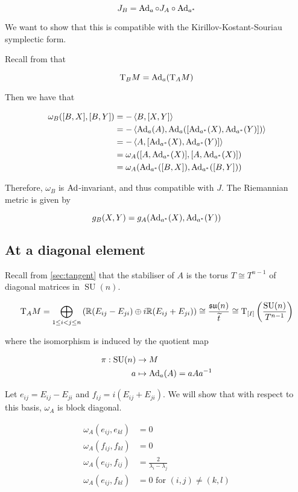 \documentclass{article}
\DeclareMathOperator{\SU}{SU}
\newcommand{\su}{\mathfrak{su}}
\renewcommand{\tilde}{\widetilde}
\begin{document}
\[J_B = \operatorname{Ad}_a \circ J_A \circ \operatorname{Ad}_{a^*}\]

We want to show that this is compatible with the Kirillov-Kostant-Souriau symplectic form.

Recall from that

\[\mathrm{T}_BM = \operatorname{Ad}_a(\mathrm{T}_A M)\]

Then we have that

\begin{align*}
    \omega_B([B, X], [B, Y]) &= -\left\langle B, [X, Y] \right\rangle \\
    &= -\left\langle \operatorname{Ad}_a(A), \operatorname{Ad}_a([\operatorname{Ad}_{a^*}(X), \operatorname{Ad}_{a^*}(Y)]) \right\rangle \\
    &= -\left\langle A, [\operatorname{Ad}_{a^*}(X), \operatorname{Ad}_{a^*}(Y)] \right\rangle \\
    &= \omega_A([A, \operatorname{Ad}_{a^*}(X)], [A, \operatorname{Ad}_{a^*}(X)]) \\
    &= \omega_A(\operatorname{Ad}_{a^*}([B, X]), \operatorname{Ad}_{a^*}([B, Y]))
\end{align*}

Therefore, \(\omega_B\) is \(\operatorname{Ad}\)-invariant, and thus compatible with \(J\). The Riemannian metric is given by

\[g_B(X, Y) = g_A(\operatorname{Ad}_{a^*}(X), \operatorname{Ad}_{a^*}(Y))\]

\subsection{At a diagonal element}

Recall from \cref{sec:tangent} that the stabiliser of \(A\) is the torus \(T \cong T^{n-1}\) of diagonal matrices in \(\SU(n)\).

\[\T_A M = \bigoplus_{1 \le i < j \le n} \left(\R(E_{ij} - E_{ji}) \oplus i\R (E_{ij} + E_{ji})\right) \cong \frac{\su(n)}{\tilde t} \cong \T_{[I]}\left(\frac{\SU(n)}{T^{n-1}}\right)\]

where the isomorphism is induced by the quotient map

\begin{align*}
    \pi : \SU(n) &\to M \\
    a &\mapsto \Ad_a(A) = aAa^{-1}
\end{align*}

Let \(e_{ij} = E_{ij} - E_{ji}\) and \(f_{ij} = i(E_{ij} + E_{ji})\). We will show that with respect to this basis, \(\omega_A\) is block diagonal.

\begin{proposition}
    \label{prop:omega-block-diag}
    \begin{align*}
        \omega_A(e_{ij}, e_{kl}) &= 0 \\
        \omega_A(f_{ij}, f_{kl}) &= 0 \\
        \omega_A(e_{ij}, f_{ij}) &= \frac{2}{\lambda_i - \lambda_j} \\
        \omega_A(e_{ij}, f_{kl}) &= 0 \text{ for }(i, j) \ne (k, l)
    \end{align*}
\end{proposition}
\end{document}
